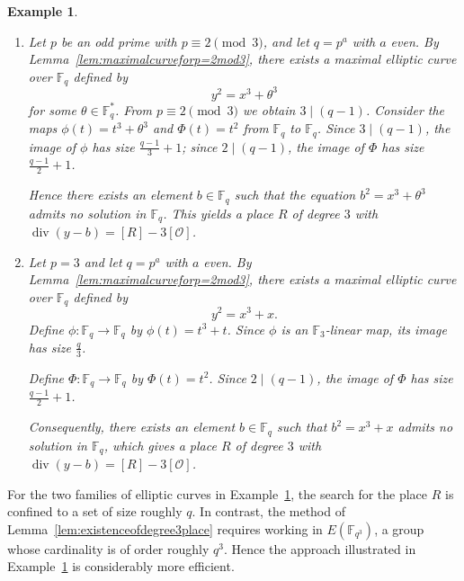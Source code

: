 \documentclass[journal,12pt,onecolumn]{IEEEtran}
\newtheorem{example}[theorem]{Example}
\begin{document}
\begin{example}\label{ex:p=2mod3}
    \begin{enumerate}
        \item Let $p$ be an odd prime with $p \equiv 2 \pmod{3}$, and let $q = p^a$ with $a$ even. By Lemma~\ref{lem:maximalcurveforp=2mod3}, there exists a maximal elliptic curve over $\mathbb{F}_q$ defined by 
        \[
        y^2 = x^3 + \theta^3
        \]
        for some $\theta \in \mathbb{F}_{q}^*$. From $p \equiv 2 \pmod{3}$ we obtain $3 \mid (q-1)$.
        Consider the maps $\phi(t)=t^3+\theta^3$ and $\Phi(t)=t^2$ from $\mathbb{F}_q$ to $\mathbb{F}_q$. Since $3 \mid (q-1)$, the image of $\phi$ has size $\frac{q-1}{3}+1$; since $2 \mid (q-1)$, the image of $\Phi$ has size $\frac{q-1}{2}+1$.
        
        Hence there exists an element $b \in \mathbb{F}_q$ such that the equation $b^2 = x^3 + \theta^3$ admits no solution in $\mathbb{F}_q$. This yields a place $R$ of degree $3$ with $\operatorname{div}(y-b) = [R] - 3[\mathcal{O}]$.
        
        \item Let $p = 3$ and let $q = p^a$ with $a$ even. By Lemma~\ref{lem:maximalcurveforp=2mod3}, there exists a maximal elliptic curve over $\mathbb{F}_q$ defined by 
        \[
        y^2 = x^3 + x.
        \]
        Define $\phi: \mathbb{F}_q \to \mathbb{F}_q$ by $\phi(t) = t^3 + t$. Since $\phi$ is an $\mathbb{F}_3$-linear map, its image has size $\frac{q}{3}$.
        
        Define $\Phi: \mathbb{F}_q \to \mathbb{F}_q$ by $\Phi(t) = t^2$. Since $2 \mid (q-1)$, the image of $\Phi$ has size $\frac{q-1}{2} + 1$.
        
        Consequently, there exists an element $b \in \mathbb{F}_q$ such that $b^2 = x^3 + x$ admits no solution in $\mathbb{F}_q$, which gives a place $R$ of degree $3$ with $\operatorname{div}(y - b) = [R] - 3[\mathcal{O}]$.
    \end{enumerate}
\end{example}

For the two families of elliptic curves in Example~\ref{ex:p=2mod3}, the search for the place $R$ is confined to a set of size roughly $q$. In contrast, the method of Lemma~\ref{lem:existenceofdegree3place} requires working in $E(\mathbb{F}_{q^3})$, a group whose cardinality is of order roughly $q^3$. Hence the approach illustrated in Example~\ref{ex:p=2mod3} is considerably more efficient.
\end{document}
